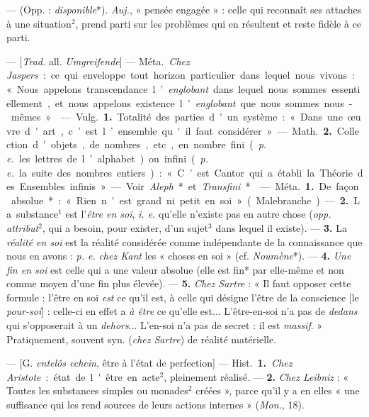 \begin{itemize}[leftmargin=1cm, label=, itemsep=1pt]
 — (Opp. : {\it disponible}*). {\it Auj.}, « pensée engagée » :
celle qui reconnaît ses attaches à une situation$^2$, prend parti sur les
problèmes qui en résultent et reste fidèle à ce parti.

 — [{\it Trad.} all. {\it Umgreifende}] —
\si{Méta.} {\it Chez Jaspers} : ce qui enveloppe tout horizon particulier
dans lequel nous vivons : « Nous appelons
transcendance l’{\it englobant} dans lequel
nous sommes essentiellement, et
nous appelons existence l’{\it englobant}
que nous sommes nous-mêmes. »

 — \si{Vulg.} {\bf 1.} Totalité des
parties d'un système : « Dans une
œuvre d'art, c’est l’ensemble qu'il
faut considérer ». — \si{Math.} {\bf 2.} Collection d’objets, de nombres,
etc., en nombre fini ({\it p. e.} les lettres de l’alphabet) ou infini
({\it p. e.} la suite des nombres entiers) : « C’est Cantor qui
a établi la Théorie des Ensembles
infinis ». — Voir {\it Aleph}* et {\it Transfini}*.

 — \si{Méta.} {\bf 1.} De façon absolue* :
« Rien n'est grand ni petit en soi »
(Malebranche). — {\bf 2.} La substance$^1$
est l'{\it être en soi}, {\it i. e.} qu’elle n'existe
pas en autre chose ({\it opp.} {\it attribut}$^2$,
qui a besoin, pour exister, d’un
sujet$^3$ dans lequel il existe). — {\bf 3.}
La {\it réalité en soi} est la réalité considérée comme indépendante de la
connaissance que nous en avons :
{\it p. e.} {\it chez Kant} les « choses en soi »
(cf. {\it Noumène}*). — {\bf 4.} {\it Une fin en soi}
est celle qui a une valeur absolue
(elle est fin* par elle-même et non
comme moyen d’une fin plus élevée).
— {\bf 5.} {\it Chez Sartre} : « Il faut opposer
cette formule : l'être en soi {\it est} ce
qu’il est, à celle qui désigne l'être
de la conscience [le {\it pour-soi}] : celle-ci
en effet a {\it à être} ce qu’elle est... L'être-en-soi n’a pas de
{\it dedans} qui s’opposerait à un {\it dehors}... L'en-soi n’a pas
de secret : il est {\it massif}. » Pratiquement, souvent syn.
({\it chez Sartre}) de réalité matérielle.

 — [G. {\it entelôs echein}, être à
l'état de perfection] — \si{Hist.} {\bf 1.}
{\it Chez Aristote} : état de l'être en
acte$^2$, pleinement réalisé. — {\bf 2.} {\it Chez
Leibniz} : « Toutes les substances
simples ou monades$^2$ créées », parce
qu’il y a en elles « une suffisance
qui les rend sources de leurs actions
internes » ({\it Mon.}, 18).


\end{itemize}
